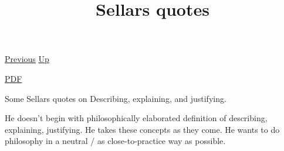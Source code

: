 \documentclass[12pt,a4paper]{report}
\begin{document}
 \href{doc/phil/People/Brandom/OnSellars/2009/Lecture01/HistoricalKantContext.html}{Previous} 
 \href{doc/phil/People/Brandom/OnSellars/2009/Lecture01.html}{Up} 

 \href{doc/phil/People/Brandom/OnSellars/2009/Lecture01/Sellarsquotes.pdf}{PDF} 
\title{Sellars quotes}
Some Sellars quotes on Describing, explaining, and justifying.

He doesn't begin with philosophically elaborated definition of describing, explaining, justifying. He takes these concepts as they come. He wants to do philosophy in a neutral / as close-to-practice way as possible.
\end{document}
